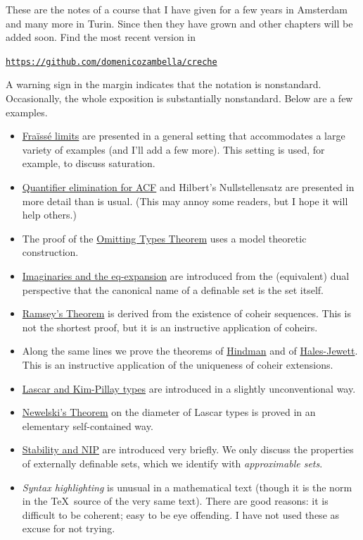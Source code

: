 \documentclass[creche.tex]{subfiles}
\begin{document}
These are the notes of a course that I have given for a few years in Amsterdam and many more in Turin.
Since then they have grown and other chapters will be added soon.
Find the most recent version in 

\hfil\href{https://github.com/domenicozambella/creche}{\tt https://github.com/domenicozambella/creche}


\noindent\llap{\textcolor{red}{\Large\danger}\kern1.5ex}A warning sign in the margin indicates that the notation is nonstandard.
Occasionally, the whole exposition is substantially nonstandard.
Below are a few examples.



\begin{itemize}
\item \hyperref[rich]{Fraïssé limits} are presented in a general setting that accommodates a large variety of examples (and I'll add a few more).
This setting is used, for example, to discuss saturation.
\item \hyperref[algebraic]{Quantifier elimination for ACF} and Hilbert's Nullstellensatz are presented in more detail than is usual.
(This may annoy some readers, but I hope it will help others.)
\item The proof of the \hyperref[countable]{Omitting Types Theorem} uses a model theoretic construction.
\item \hyperref[imaginary]{Imaginaries and the eq-expansion} are introduced from the (equivalent) dual perspective that the canonical name of a definable set is the set itself.
\item \hyperref[Ramsey]{Ramsey's Theorem} is derived from the existence of coheir sequences.
This is not the shortest proof, but it is an instructive application of coheirs.
\item Along the same lines we prove the theorems of \hyperref[Hindman]{Hindman} and of \hyperref[HJ]{Hales-Jewett}. This is an instructive application of the uniqueness of coheir extensions.
\item \hyperref[invariantL]{Lascar and Kim-Pillay types} are introduced in a slightly unconventional way.
\item \hyperref[newelski]{Newelski's Theorem\/} on the diameter of Lascar types is proved in an elementary self-contained way.
\item  \hyperref[external]{Stability and NIP\/} are introduced very briefly.
We only discuss the properties of externally definable sets, which we identify with \textit{approximable sets}.
\item \noindent\emph{Syntax highlighting\/} is unusual in a {\gr mathematical text} (though it is the norm in the {\mr\TeX\ source} of the very same text). There are good reasons: it is difficult to be coherent; easy to be eye offending. I have not used these as excuse for not trying.
\end{itemize}
\end{document}
